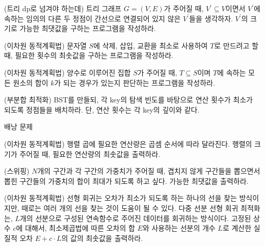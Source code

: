 \begin{example}
    (트리 dp로 넘겨야 하는데) 트리 그래프 $G=(V, E)$가 주어질 때, $V^\prime \subseteq V$이면서 $V^\prime$에 속하는 임의의 다른 두 정점이 간선으로 연결되어 있지 않은 $V^\prime$들을 생각하자. $V^\prime$의 크기로 가능한 최댓값을 구하는 프로그램을 작성하라.
\end{example}

\begin{example}
    (이차원 동적계획법) 문자열 $S$에 삭제, 삽입, 교환을 최소로 사용하여 $T$로 만드려고 할 때, 필요한 횟수의 최솟값을 구하는 프로그램을 작성하라.
\end{example}

\begin{example}
    (이차원 동적계획법) 양수로 이루어진 집합 $S$가 주어질 때, $T \subseteq S$이며 $T$에 속하는 모든 원소의 합이 $k$가 되는 경우가 있는지 판단하는 프로그램을 작성하라.
\end{example}

\begin{example}
    (부분합 최적화) BST를 만들되, 각 key의 탐색 빈도를 바탕으로 연산 횟수가 최소가 되도록 정점들을 배치하라. 단, 연산 횟수는 각 key의 깊이와 같다.
\end{example}

\begin{example}
    배낭 문제
\end{example}

\begin{example}
    (이차원 동적계획법) 행렬 곱에 필요한 연산량은 곱셈 순서에 따라 달라진다. 행렬의 크기가 주어질 때, 필요한 연산량의 최솟값을 출력하라.
\end{example}

\begin{example}
    (스위핑) $N$개의 구간과 각 구간의 가중치가 주어질 때, 겹치지 않게 구간들을 뽑으면서 뽑힌 구간들의 가중치의 합이 최대가 되도록 하고 싶다. 가능한 최댓값을 출력하라.
\end{example}

\begin{example}
    (이차원 동적계획법) 선형 회귀는 오차가 최소가 되도록 하는 하나의 선을 찾는 방식이지만, 때로는 여러 개의 선을 찾는 것이 도움이 될 수 있다. 다중 선분 선형 회귀 최적화는, $L$개의 선분으로 구성된 연속함수로 주어진 데이터를 회귀하는 방식이다. 고정된 상수 $c$에 대해서, 최소제곱법에 따른 오차의 합 $E$와 사용하는 선분의 개수 $L$로 계산한 실질적 오차 $E + c \cdot L$의 값의 최솟값을 출력하라.
\end{example}


